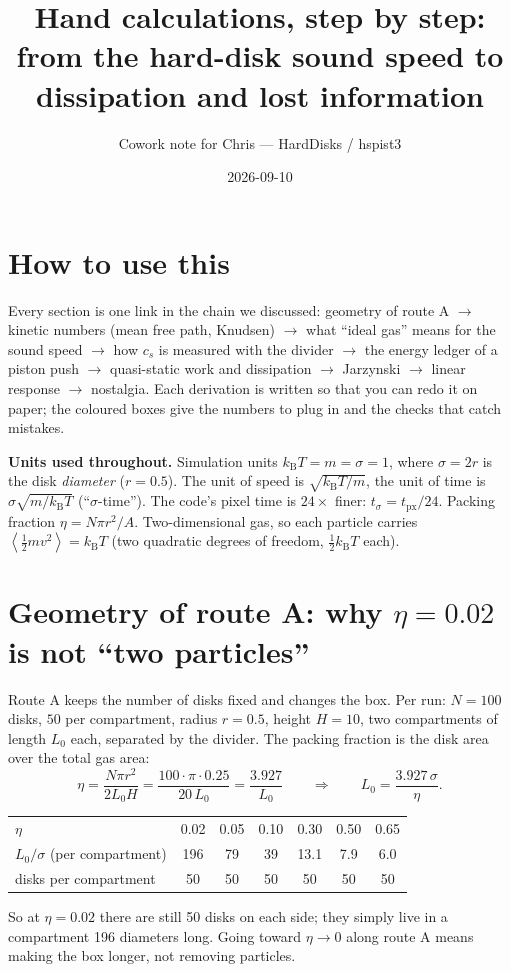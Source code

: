 \documentclass[11pt,a4paper]{article}
\title{Hand calculations, step by step:\\ from the hard-disk sound speed to dissipation and lost information}
\author{Cowork note for Chris --- HardDisks / hspist3}
\date{2026-09-10}
\newcommand{\kT}{k_{\mathrm B}T}
\newcommand{\avg}[1]{\left\langle #1 \right\rangle}
\begin{document}
\maketitle

\section*{How to use this}
Every section is one link in the chain we discussed: geometry of route A $\to$ kinetic numbers (mean free path, Knudsen) $\to$ what ``ideal gas'' means for the sound speed $\to$ how $c_s$ is measured with the divider $\to$ the energy ledger of a piston push $\to$ quasi-static work and dissipation $\to$ Jarzynski $\to$ linear response $\to$ nostalgia. Each derivation is written so that you can redo it on paper; the coloured boxes give the numbers to plug in and the checks that catch mistakes.

\textbf{Units used throughout.} Simulation units $\kT = m = \sigma = 1$, where $\sigma = 2r$ is the disk \emph{diameter} ($r = 0.5$). The unit of speed is $\sqrt{\kT/m}$, the unit of time is $\sigma\sqrt{m/\kT}$ (``$\sigma$-time''). The code's pixel time is $24\times$ finer: $t_\sigma = t_{\mathrm{px}}/24$. Packing fraction $\eta = N\pi r^2/A$. Two-dimensional gas, so each particle carries $\avg{\tfrac12 m v^2} = \kT$ (two quadratic degrees of freedom, $\tfrac12\kT$ each).

\tableofcontents

\section{Geometry of route A: why \texorpdfstring{$\eta = 0.02$}{eta = 0.02} is not ``two particles''}

Route A keeps the number of disks fixed and changes the box. Per run: $N = 100$ disks, $50$ per compartment, radius $r = 0.5$, height $H = 10$, two compartments of length $L_0$ each, separated by the divider. The packing fraction is the disk area over the total gas area:
\begin{equation}
\eta = \frac{N\pi r^2}{2 L_0 H} = \frac{100\cdot\pi\cdot 0.25}{20\,L_0} = \frac{3.927}{L_0}
\qquad\Longrightarrow\qquad
L_0 = \frac{3.927\,\sigma}{\eta}.
\label{eq:L0}
\end{equation}

\begin{worked}
\begin{tabular}{@{}lcccccc@{}}
\toprule
$\eta$ & 0.02 & 0.05 & 0.10 & 0.30 & 0.50 & 0.65\\
$L_0/\sigma$ (per compartment) & 196 & 79 & 39 & 13.1 & 7.9 & 6.0\\
disks per compartment & 50 & 50 & 50 & 50 & 50 & 50\\
\bottomrule
\end{tabular}

So at $\eta = 0.02$ there are still 50 disks on each side; they simply live in a compartment 196 diameters long. Going toward $\eta \to 0$ along route A means making the box longer, not removing particles.
\end{worked}
\end{document}

